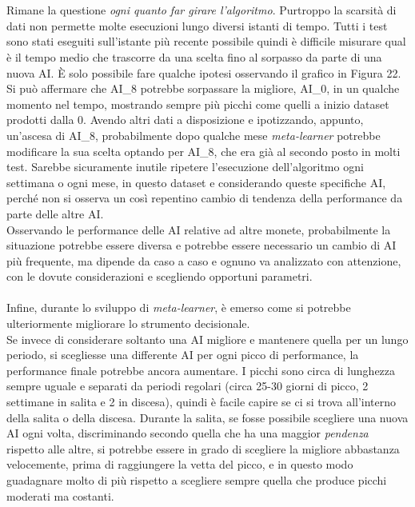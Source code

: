 \documentclass[a4paper,12pt]{report}
\begin{document}
\begin{fig}
\\~\\Rimane la questione \textit{ogni quanto far girare l'algoritmo}. Purtroppo la scarsità di dati non permette molte esecuzioni lungo diversi istanti di tempo. Tutti i test sono stati eseguiti sull'istante più recente possibile quindi è difficile misurare qual è il tempo medio che trascorre da una scelta fino al sorpasso da parte di una nuova AI. È solo possibile fare qualche ipotesi osservando il grafico in Figura 22.\\ Si può affermare che AI\_8 potrebbe sorpassare la migliore, AI\_0, in un qualche momento nel tempo, mostrando sempre più picchi come quelli a inizio dataset prodotti dalla 0. Avendo altri dati a disposizione e ipotizzando, appunto, un'ascesa di AI\_8, probabilmente dopo qualche mese \textit{meta-learner} potrebbe modificare la sua scelta optando per AI\_8, che era già al secondo posto in molti test. Sarebbe sicuramente inutile ripetere l'esecuzione dell'algoritmo ogni settimana o ogni mese, in questo dataset e considerando queste specifiche AI, perché non si osserva un così repentino cambio di tendenza della performance da parte delle altre AI.\\Osservando le performance delle AI relative ad altre monete, probabilmente la situazione potrebbe essere diversa e potrebbe essere necessario un cambio di AI più frequente, ma dipende da caso a caso e ognuno va analizzato con attenzione, con le dovute considerazioni e scegliendo opportuni parametri.\\~\\ Infine, durante lo sviluppo di \textit{meta-learner}, è emerso come si potrebbe ulteriormente migliorare lo strumento decisionale.\\ Se invece di considerare soltanto una AI migliore e mantenere quella per un lungo periodo, si scegliesse una differente AI per ogni picco di performance, la performance finale potrebbe ancora aumentare. I picchi sono circa di lunghezza sempre uguale e separati da periodi regolari (circa 25-30 giorni di picco, 2 settimane in salita e 2 in discesa), quindi è facile capire se ci si trova all'interno della salita o della discesa. Durante la salita, se fosse possibile scegliere una nuova AI ogni volta, discriminando secondo quella che ha una maggior \textit{pendenza} rispetto alle altre, si potrebbe essere in grado di scegliere la migliore abbastanza velocemente, prima di raggiungere la vetta del picco, e in questo modo guadagnare molto di più rispetto a scegliere sempre quella che produce picchi moderati ma costanti.

\end{fig}
\end{document}
